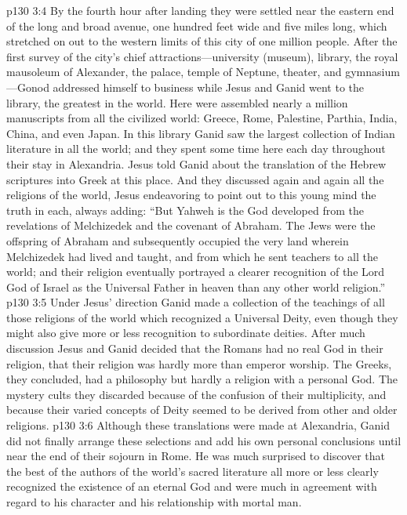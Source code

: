 \pc \vs p130 3:4 By the fourth hour after landing they were settled near the eastern end of the long and broad avenue, one hundred feet wide and five miles long, which stretched on out to the western limits of this city of one million people. After the first survey of the city’s chief attractions---university (museum), library, the royal mausoleum of Alexander, the palace, temple of Neptune, theater, and gymnasium---Gonod addressed himself to business while Jesus and Ganid went to the library, the greatest in the world. Here were assembled nearly a million manuscripts from all the civilized world: Greece, Rome, Palestine, Parthia, India, China, and even Japan. In this library Ganid saw the largest collection of Indian literature in all the world; and they spent some time here each day throughout their stay in Alexandria. Jesus told Ganid about the translation of the Hebrew scriptures into Greek at this place. And they discussed again and again all the religions of the world, Jesus endeavoring to point out to this young mind the truth in each, always adding: \textcolor{ubdarkred}{“But Yahweh is the God developed from the revelations of Melchizedek and the covenant of Abraham. The Jews were the offspring of Abraham and subsequently occupied the very land wherein Melchizedek had lived and taught, and from which he sent teachers to all the world; and their religion eventually portrayed a clearer recognition of the Lord God of Israel as the Universal Father in heaven than any other world religion.”}
\pc \vs p130 3:5 Under Jesus’ direction Ganid made a collection of the teachings of all those religions of the world which recognized a Universal Deity, even though they might also give more or less recognition to subordinate deities. After much discussion Jesus and Ganid decided that the Romans had no real God in their religion, that their religion was hardly more than emperor worship. The Greeks, they concluded, had a philosophy but hardly a religion with a personal God. The mystery cults they discarded because of the confusion of their multiplicity, and because their varied concepts of Deity seemed to be derived from other and older religions.
\vs p130 3:6 Although these translations were made at Alexandria, Ganid did not finally arrange these selections and add his own personal conclusions until near the end of their sojourn in Rome. He was much surprised to discover that the best of the authors of the world’s sacred literature all more or less clearly recognized the existence of an eternal God and were much in agreement with regard to his character and his relationship with mortal man.
